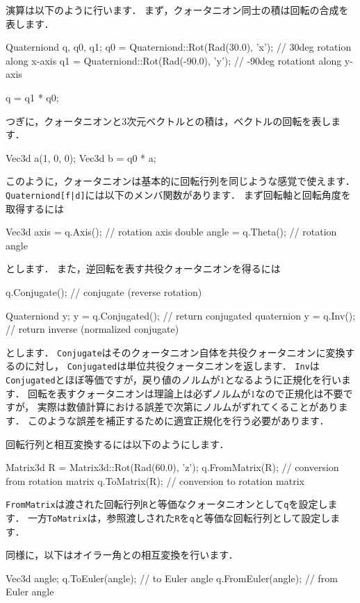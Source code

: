 \KLUDGE 演算は以下のように行います．
\KLUDGE まず，クォータニオン同士の積は回転の合成を表します．
\begin{sourcecode}
Quaterniond q, q0, q1;
q0 = Quaterniond::Rot(Rad(30.0), 'x');   // 30deg rotation along x-axis
q1 = Quaterniond::Rot(Rad(-90.0), 'y');  // -90deg rotationt along y-axis

q = q1 * q0;
\end{sourcecode}
\KLUDGE つぎに，クォータニオンと3次元ベクトルとの積は，ベクトルの回転を表します．
\begin{sourcecode}
Vec3d a(1, 0, 0);
Vec3d b = q0 * a;
\end{sourcecode}
\KLUDGE このように，クォータニオンは基本的に回転行列を同じような感覚で使えます．
\texttt{Quaterniond[f|d]}には以下のメンバ関数があります．
\KLUDGE まず回転軸と回転角度を取得するには
\begin{sourcecode}
Vec3d axis = q.Axis();        // rotation axis
double angle = q.Theta();     // rotation angle
\end{sourcecode}
\KLUDGE とします．
\KLUDGE また，逆回転を表す共役クォータニオンを得るには
\begin{sourcecode}
q.Conjugate();         // conjugate (reverse rotation)

Quaterniond y;
y = q.Conjugated();    // return conjugated quaternion
y = q.Inv();           // return inverse (normalized conjugate)
\end{sourcecode}
\KLUDGE とします．
\texttt{Conjugate}はそのクォータニオン自体を共役クォータニオンに変換するのに対し，
\texttt{Conjugated}は単位共役クォータニオンを返します．
\texttt{Inv}は\texttt{Conjugated}とほぼ等価ですが，戻り値のノルムが$1$となるように正規化を行います．
\KLUDGE 回転を表すクォータニオンは理論上は必ずノルムが$1$なので正規化は不要ですが，
\KLUDGE 実際は数値計算における誤差で次第にノルムがずれてくることがあります．
\KLUDGE このような誤差を補正するために適宜正規化を行う必要があります．

\KLUDGE 回転行列と相互変換するには以下のようにします．
\begin{sourcecode}
Matrix3d R = Matrix3d::Rot(Rad(60.0), 'z');
q.FromMatrix(R);       // conversion from rotation matrix
q.ToMatrix(R);         // conversion to rotation matrix
\end{sourcecode}
\texttt{FromMatrix}は渡された回転行列\texttt{R}と等価なクォータニオンとして\texttt{q}を設定します．
\KLUDGE 一方\texttt{ToMatrix}は，参照渡しされた\texttt{R}を\texttt{q}と等価な回転行列として設定します．

\KLUDGE 同様に，以下はオイラー角との相互変換を行います．
\begin{sourcecode}
Vec3d angle;
q.ToEuler(angle);      // to Euler angle
q.FromEuler(angle);    // from Euler angle
\end{sourcecode}

